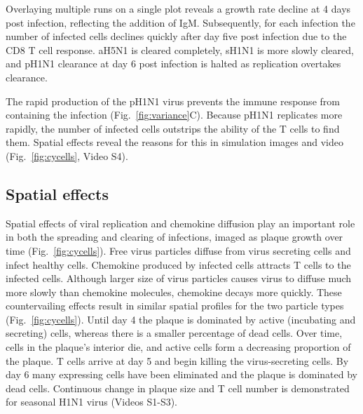 \documentclass[10pt]{article}
\begin{document}
Overlaying multiple runs on a single plot reveals a growth rate decline at 4 days post infection, reflecting the addition of IgM.  Subsequently, for each infection the number of infected cells declines quickly after day five post infection due to the CD8 T cell response.  aH5N1 is cleared completely, sH1N1 is more slowly cleared, and pH1N1 clearance at day 6 post infection is halted as replication overtakes clearance.

The rapid production of the pH1N1 virus prevents the immune response from containing the infection (Fig.~\ref{fig:variance}C).  Because pH1N1 replicates more rapidly, the number of infected cells outstrips the ability of the T cells to find them.   Spatial effects reveal the reasons for this in simulation images and video (Fig.~\ref{fig:cycells}, Video S4). 


\subsection*{Spatial effects}

Spatial effects of viral replication and chemokine diffusion play an important role in both the spreading and clearing of infections, imaged as plaque growth over time (Fig.~\ref{fig:cycells}).  Free virus particles diffuse from virus secreting cells and infect healthy cells.  Chemokine produced by infected cells attracts T cells to the infected cells.  Although larger size of virus particles causes virus to diffuse much more slowly than chemokine molecules, chemokine decays more quickly.  These countervailing effects result in similar spatial profiles for the two particle types (Fig.~\ref{fig:cycells}). Until day 4 the plaque is dominated by active (incubating and secreting) cells, whereas there is a smaller percentage of dead cells. Over time, cells in the plaque's interior die, and active cells form a decreasing proportion of the plaque. T cells arrive at day 5 and begin killing the virus-secreting cells. By day 6 many expressing cells have been eliminated and the plaque is dominated by dead cells.  Continuous change in plaque size and T cell number is demonstrated for seasonal H1N1 virus (Videos S1-S3).
\end{document}
